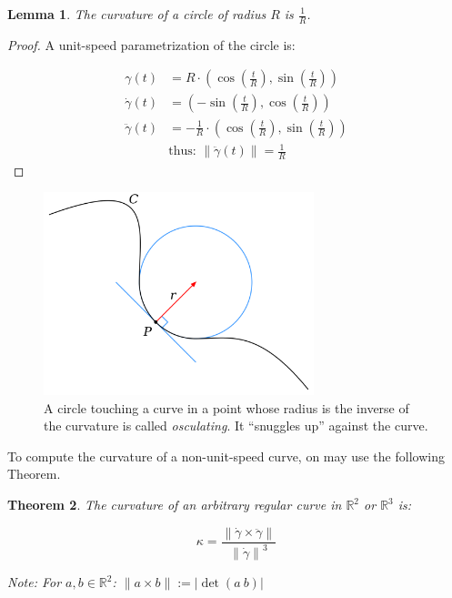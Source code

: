 \documentclass[a4paper,11pt,notitlepage,fullpage]{paper}
\newcommand{\dy}{\dot\gamma}
\newcommand{\ddy}{\ddot\gamma}
\theoremstyle{plain}
\newtheorem{thm}{Theorem}[section] %
\newtheorem{lem}[thm]{Lemma}
\theoremstyle{definition}
\begin{document}
\begin{lem}
The curvature of a circle of radius $R$ is $\frac{1}{R}$.
\end{lem}

\begin{proof} A unit-speed parametrization of the circle is:

\begin{align*}
\gamma(t) &= R \cdot \left(\cos\left(\frac{t}{R}\right), \sin\left(\frac{t}{R}\right)\right) \\
\dot\gamma(t) &= \left(-\sin\left(\frac{t}{R}\right), \cos\left(\frac{t}{R}\right)\right) \\
\ddot\gamma(t) &= -\frac{1}{R} \cdot \left(\cos\left(\frac{t}{R}\right), \sin\left(\frac{t}{R}\right)\right) \\
&\text{thus: } \left\|\ddot\gamma(t)\right\| = \frac{1}{R} 
\end{align*}
\end{proof}

\begin{figure}[H]
\centering
\includegraphics[width = 0.7\textwidth]{img/schmiegekreis}
\caption{A circle touching a curve in a point whose radius is the inverse of the curvature is called \emph{osculating}. It ``snuggles up'' against the curve.}
\label{fig:schmiegekreis}
\end{figure}


To compute the curvature of a non-unit-speed curve, on may use the following Theorem.

\begin{thm}
\label{thm:curvature_arbitrary_curve}
The curvature of an arbitrary regular curve in $\mathbb R^2$ or $\mathbb R^3$ is:

\begin{equation*}
\kappa = \frac{\left\|\dy \times \ddy\right\|}{\left\|\dy\right\|^3}
\end{equation*}

Note: For $a, b \in \mathbb R^2$: $\|a \times b\| := |\det(a~b)|$
\end{thm}
\end{document}
